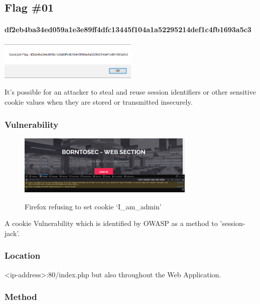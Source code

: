 \subsection{Flag \#01}
\paragraph{df2eb4ba34ed059a1e3e89ff4dfc13445f104a1a52295214def1c4fb1693a5c3}
\begin{center}
    \includegraphics[width=0.5\textwidth]{07.Flag04/01-03.png}\\[0cm] 
\end{center}

It's possible for an attacker to steal and reuse
session identifiers or other sensitive cookie values
when they are stored or transmitted insecurely\cite{OWASP}.

\subsubsection{Vulnerability}
\begin{figure}[!htb]
    \centering
    \includegraphics[width=0.752\textwidth]{07.Flag04/01-01.png}\\[0cm]  
    \caption[Cookie Alert]{Firefox refusing to set cookie `I\_am\_admin'}
    \label{fig:03-01 - Firefox rejects cookie iamadmin} 
\end{figure}
A cookie Vulnerability which is identified by OWASP as a
method to 'session-jack'\cite{OWASP}.

\subsubsection{Location}
<ip-address>:80/index.php but also throughout the Web Application.

\subsubsection{Method}

